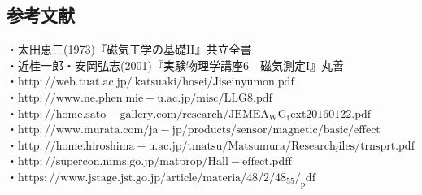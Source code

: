 \documentclass{jsarticle}
\begin{document}
\subsection*{参考文献}
・太田恵三(1973)『磁気工学の基礎II』共立全書\\
\quad  ・近桂一郎・安岡弘志(2001)『実験物理学講座6　磁気測定I』丸善\\
\quad・$\mathrm{http://web.tuat.ac.jp/~katsuaki/hosei/Jiseinyumon.pdf}$\\
\quad・$\mathrm{http://www.ne.phen.mie-u.ac.jp/misc/LLG8.pdf}$\\
\quad・$\mathrm{http://home.sato-gallery.com/research/JEMEA_WG_text20160122.pdf}$\\
\quad・$\mathrm{http://www.murata.com/ja-jp/products/sensor/magnetic/basic/effect}$\\
\quad・$\mathrm{http://home.hiroshima-u.ac.jp/tmatsu/Matsumura/Research_files/trnsprt.pdf}$\\
\quad・$\mathrm{http://supercon.nims.go.jp/matprop/Hall-effect.pdff}$\\
\quad・$\mathrm{https://www.jstage.jst.go.jp/article/materia/48/2/48_55/_pdf}$\\
\end{document}
